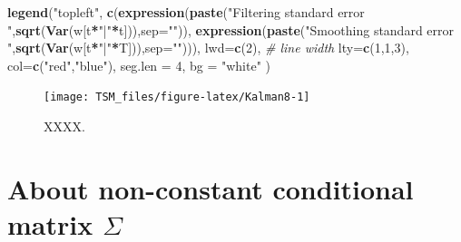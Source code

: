 \documentclass[
  12pt,
]{book}
\newenvironment{Shaded}{\begin{snugshade}}{\end{snugshade}}
\newcommand{\AttributeTok}[1]{\textcolor[rgb]{0.13,0.29,0.53}{#1}}
\newcommand{\CommentTok}[1]{\textcolor[rgb]{0.56,0.35,0.01}{\textit{#1}}}
\newcommand{\DecValTok}[1]{\textcolor[rgb]{0.00,0.00,0.81}{#1}}
\newcommand{\FunctionTok}[1]{\textcolor[rgb]{0.13,0.29,0.53}{\textbf{#1}}}
\newcommand{\NormalTok}[1]{#1}
\newcommand{\SpecialCharTok}[1]{\textcolor[rgb]{0.81,0.36,0.00}{\textbf{#1}}}
\newcommand{\StringTok}[1]{\textcolor[rgb]{0.31,0.60,0.02}{#1}}
\theoremstyle{definition}
\theoremstyle{definition}
\theoremstyle{definition}
\theoremstyle{definition}
\theoremstyle{remark}
\begin{document}
\begin{Shaded}
\begin{Highlighting}[]
\FunctionTok{legend}\NormalTok{(}\StringTok{"topleft"}\NormalTok{, }
       \FunctionTok{c}\NormalTok{(}\FunctionTok{expression}\NormalTok{(}\FunctionTok{paste}\NormalTok{(}\StringTok{"Filtering standard error "}\NormalTok{,}\FunctionTok{sqrt}\NormalTok{(}\FunctionTok{Var}\NormalTok{(w[t}\SpecialCharTok{*}\StringTok{"|"}\SpecialCharTok{*}\NormalTok{t])),}\AttributeTok{sep=}\StringTok{""}\NormalTok{)),}
         \FunctionTok{expression}\NormalTok{(}\FunctionTok{paste}\NormalTok{(}\StringTok{"Smoothing standard error "}\NormalTok{,}\FunctionTok{sqrt}\NormalTok{(}\FunctionTok{Var}\NormalTok{(w[t}\SpecialCharTok{*}\StringTok{"|"}\SpecialCharTok{*}\NormalTok{T])),}\AttributeTok{sep=}\StringTok{""}\NormalTok{))),}
       \AttributeTok{lwd=}\FunctionTok{c}\NormalTok{(}\DecValTok{2}\NormalTok{), }\CommentTok{\# line width}
       \AttributeTok{lty=}\FunctionTok{c}\NormalTok{(}\DecValTok{1}\NormalTok{,}\DecValTok{1}\NormalTok{,}\DecValTok{3}\NormalTok{),}
       \AttributeTok{col=}\FunctionTok{c}\NormalTok{(}\StringTok{"red"}\NormalTok{,}\StringTok{"blue"}\NormalTok{),}
       \AttributeTok{seg.len =} \DecValTok{4}\NormalTok{,}
       \AttributeTok{bg =} \StringTok{"white"}
\NormalTok{)}
\end{Highlighting}
\end{Shaded}

\begin{figure}
\texttt{[image: TSM\_files/figure-latex/Kalman8-1]} \caption{XXXX.}\label{fig:Kalman8}
\end{figure}

\hypertarget{about-non-constant-conditional-matrix-sigma}{%
\section{\texorpdfstring{About non-constant conditional matrix \(\Sigma\)}{About non-constant conditional matrix \textbackslash Sigma}}\label{about-non-constant-conditional-matrix-sigma}}
\end{document}
